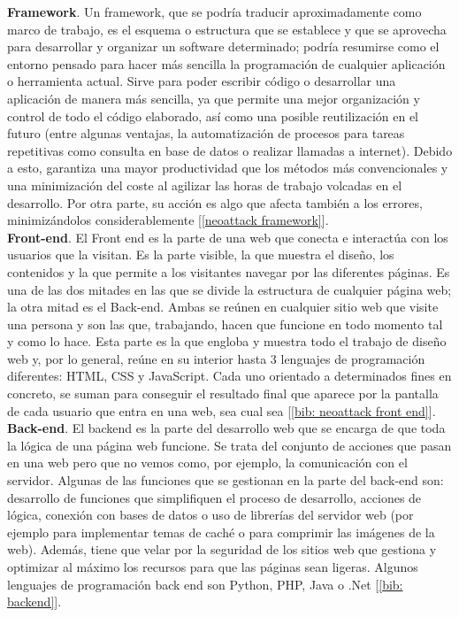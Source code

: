 \documentclass[12pt]{article}
\begin{document}
	\noindent \textbf{\large Framework}. Un framework, que se podría traducir aproximadamente como marco de trabajo, es el esquema o estructura que se establece y que se aprovecha para desarrollar y organizar un software determinado; podría resumirse como el entorno pensado para hacer más sencilla la programación de cualquier aplicación o herramienta actual. Sirve para poder escribir código o desarrollar una aplicación de manera más sencilla, ya que permite una mejor organización y control de todo el código elaborado, así como una posible reutilización en el futuro (entre algunas ventajas, la automatización de procesos para tareas repetitivas como consulta en base de datos o realizar llamadas a internet). Debido a esto, garantiza una mayor productividad que los métodos más convencionales y una minimización del coste al agilizar las horas de trabajo volcadas en el desarrollo. Por otra parte, su acción es algo que afecta también a los errores, minimizándolos considerablemente [\ref{neoattack framework}]. \\
	
	\noindent \textbf{\large Front-end}. El Front end es la parte de una web que conecta e interactúa con los usuarios que la visitan. Es la parte visible, la que muestra el diseño, los contenidos y la que permite a los visitantes navegar por las diferentes páginas. Es una de las dos mitades en las que se divide la estructura de cualquier página web; la otra mitad es el Back-end. Ambas se reúnen en cualquier sitio web que visite una persona y son las que, trabajando, hacen que funcione en todo momento tal y como lo hace. Esta parte es la que engloba y muestra todo el trabajo de diseño web y, por lo general, reúne en su interior hasta 3 lenguajes de programación diferentes: HTML, CSS y JavaScript. Cada uno orientado a determinados fines en concreto, se suman para conseguir el resultado final que aparece por la pantalla de cada usuario que entra en una web, sea cual sea [\ref{bib: neoattack front end}]. \\
	
	\noindent \textbf{\large Back-end}. El backend es la parte del desarrollo web que se encarga de que toda la lógica de una página web  funcione. Se trata del conjunto de acciones que pasan en una web pero que no vemos como, por ejemplo, la comunicación con el servidor. Algunas de las funciones que se gestionan en la parte del back-end son: desarrollo de funciones que simplifiquen el proceso de desarrollo, acciones de lógica, conexión con bases de datos o uso de librerías del servidor web (por ejemplo para implementar temas de caché o para comprimir las imágenes de la web). Además, tiene que velar por la seguridad de los sitios web que gestiona y optimizar al máximo los recursos para que las páginas sean ligeras. Algunos lenguajes de programación back end son Python, PHP, Java o .Net [\ref{bib: backend}]. \\
	
\end{document}
